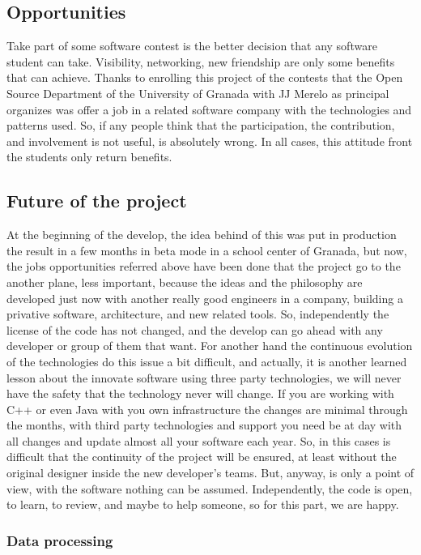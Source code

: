 \subsection{Opportunities}

Take part of some software contest is the better decision that any
software student can take. Visibility, networking, new friendship are only some
benefits that can achieve.
\intro
Thanks to enrolling this project of the contests that the Open Source Department of
the University of Granada with JJ Merelo as principal organizes was offer a job
in a related software company with the technologies and patterns used.
So, if any people think that the participation, the contribution, and involvement
is not useful, is absolutely wrong. In all cases, this attitude front the
students only return benefits.

\subsection{Future of the project}

At the beginning of the develop, the idea behind of this was put in production
the result in a few months in beta mode in a school center of Granada, but now,
the jobs opportunities referred above have been done that the project go to the
another plane, less important, because the ideas and the philosophy are
developed just now with another really good engineers in a company, building a
privative software, architecture, and new related tools.
\intro
So, independently the license of the code has not changed, and the develop can
go ahead with any developer or group of them that want. For another hand the
continuous evolution of the technologies do this issue a
bit difficult, and actually, it is another learned lesson about the innovate
software using three party technologies, we will never have the safety that the
technology never will change. If you are working with C++ or even Java with you
own infrastructure the changes are minimal through the months, with third party
technologies and support you need be at day with all changes and update almost
all your software each year. So, in this cases is difficult that the continuity
of the project will be ensured, at least without the original designer inside the
new developer's teams. But, anyway, is only a point of view, with the software
nothing can be assumed.
\intro
Independently, the code is open, to learn, to review, and maybe to help someone,
so for this part, we are happy.

\subsubsection{Data processing}

